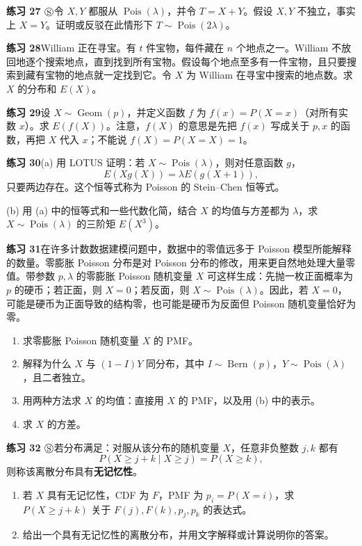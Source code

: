 \documentclass[UTF8, 12pt, fontset=fandol, oneside]{ctexart}
\begin{document}
\noindent\textbf{练习 27 $\circledS$}\quad 令 $X,Y$ 都服从 $\operatorname{Pois}(\lambda)$，并令 $T=X+Y$。假设 $X,Y$ 不独立，事实上 $X=Y$。证明或反驳在此情形下 $T\sim\operatorname{Pois}(2\lambda)$。

\noindent\textbf{练习 28}\quad William 正在寻宝。有 $t$ 件宝物，每件藏在 $n$ 个地点之一。William 不放回地逐个搜索地点，直到找到所有宝物。假设每个地点至多有一件宝物，且只要搜索到藏有宝物的地点就一定找到它。令 $X$ 为 William 在寻宝中搜索的地点数。求 $X$ 的分布和 $E(X)$。

\noindent\textbf{练习 29}\quad 设 $X\sim\operatorname{Geom}(p)$，并定义函数 $f$ 为 $f(x)=P(X=x)$（对所有实数 $x$）。求 $E(f(X))$。注意，$f(X)$ 的意思是先把 $f(x)$ 写成关于 $p,x$ 的函数，再把 $X$ 代入 $x$；不能说 $f(X)=P(X=X)=1$。

\noindent\textbf{练习 30}\quad (a) 用 LOTUS 证明：若 $X\sim\operatorname{Pois}(\lambda)$，则对任意函数 $g$，
\[
  E(Xg(X))=\lambda E(g(X+1)),
\]
只要两边存在。这个恒等式称为 Poisson 的 Stein--Chen 恒等式。

(b) 用 (a) 中的恒等式和一些代数化简，结合 $X$ 的均值与方差都为 $\lambda$，求 $X\sim\operatorname{Pois}(\lambda)$ 的三阶矩 $E(X^3)$。

\noindent\textbf{练习 31}\quad 在许多计数数据建模问题中，数据中的零值远多于 Poisson 模型所能解释的数量。零膨胀 Poisson 分布是对 Poisson 分布的修改，用来更自然地处理大量零值。带参数 $p,\lambda$ 的零膨胀 Poisson 随机变量 $X$ 可这样生成：先抛一枚正面概率为 $p$ 的硬币；若正面，则 $X=0$；若反面，则 $X\sim\operatorname{Pois}(\lambda)$。因此，若 $X=0$，可能是硬币为正面导致的结构零，也可能是硬币为反面但 Poisson 随机变量恰好为零。
\begin{enumerate}
  \item[(a)] 求零膨胀 Poisson 随机变量 $X$ 的 PMF。
  \item[(b)] 解释为什么 $X$ 与 $(1-I)Y$ 同分布，其中 $I\sim\operatorname{Bern}(p)$，$Y\sim\operatorname{Pois}(\lambda)$，且二者独立。
  \item[(c)] 用两种方法求 $X$ 的均值：直接用 $X$ 的 PMF，以及用 (b) 中的表示。
  \item[(d)] 求 $X$ 的方差。
\end{enumerate}

\noindent\textbf{练习 32 $\circledS$}\quad 若分布满足：对服从该分布的随机变量 $X$，任意非负整数 $j,k$ 都有
\[
  P(X\ge j+k\mid X\ge j)=P(X\ge k),
\]
则称该离散分布具有\textbf{无记忆性}。
\begin{enumerate}
  \item[(a)] 若 $X$ 具有无记忆性，CDF 为 $F$，PMF 为 $p_i=P(X=i)$，求 $P(X\ge j+k)$ 关于 $F(j),F(k),p_j,p_k$ 的表达式。
  \item[(b)] 给出一个具有无记忆性的离散分布，并用文字解释或计算说明你的答案。
\end{enumerate}
\end{document}
